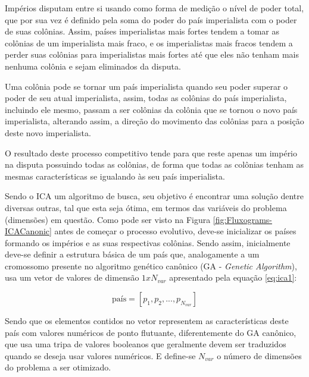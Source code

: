 Impérios disputam entre si usando como forma de medição o nível de poder total, que por sua vez é definido pela soma do poder do país imperialista com o poder de suas colônias. Assim, países imperialistas mais fortes tendem a tomar as colônias de um imperialista mais fraco, e os imperialistas mais fracos tendem a perder suas colônias para imperialistas mais fortes até que eles não tenham mais nenhuma colônia e sejam eliminados da disputa. 

Uma colônia pode se tornar um país imperialista quando seu poder superar o poder de seu atual imperialista, assim, todas as colônias do país imperialista, incluindo ele mesmo, passam a ser colônias da colônia que se tornou o novo país imperialista, alterando assim, a direção do movimento das colônias para a posição deste novo imperialista.

O resultado deste processo competitivo tende para que reste apenas um império na disputa possuindo todas as colônias, de forma que todas as colônias tenham as mesmas características se igualando às seu país imperialista.

Sendo o ICA um algoritmo de busca, seu objetivo é encontrar uma solução dentre diversas outras, tal que esta seja ótima, em termos das variáveis do problema (dimensões) em questão.  Como pode ser visto na Figura \ref{fig:Fluxograms-ICACanonic} antes de começar o processo evolutivo, deve-se inicializar os países formando os impérios e as suas respectivas colônias. Sendo assim, inicialmente deve-se definir a estrutura básica de um país que, analogamente a um cromossomo presente no algoritmo genético canônico (GA - \emph{Genetic Algorithm}), usa um vetor de valores de dimensão \(1xN_{var}\) apresentado pela equação \ref{eq:ica1}:

\begin{equation}
\label{eq:ica1}
\text{país} = [p_{1},p_{2},...,p_{N_{var}}] 
\end{equation}

Sendo que os elementos contidos no vetor representem as características deste país com valores numéricos de ponto flutuante, diferentemente do GA canônico, que usa uma tripa de valores booleanos que geralmente devem ser traduzidos quando se deseja usar valores numéricos. E define-se \(N_{var}\) o número de dimensões do problema a ser otimizado. 

